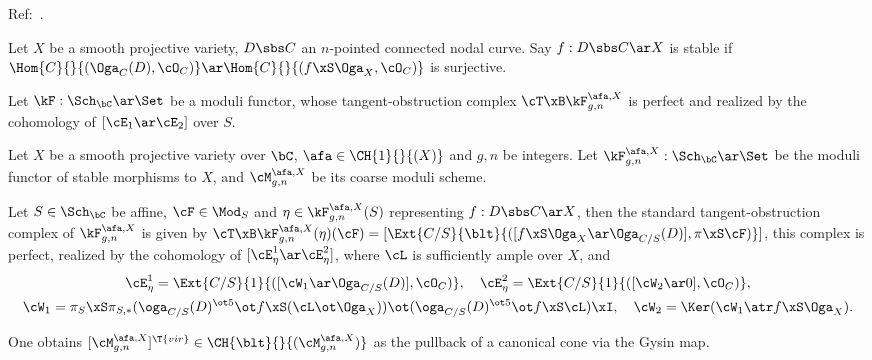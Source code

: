 \documentclass[a4paper, twoside]{article}
\begin{document}
\confighead{}{}{}


Ref:~\cite{LT1998}.

\begin{cmt}[0]
    \begin{dfn}
        Let $X$ be a smooth projective variety, $D\sbs C$ an $n$-pointed connected nodal curve. Say $f:D\sbs C\ar X$ is stable if $\Hom{C}{}{(\Oga_{C}(D),\cO_{C})}\ar\Hom{C}{}{(f\xS\Oga_{X},\cO_{C})}$ is surjective.
    \end{dfn}
\end{cmt}

\begin{cmt}[0]
    Let $\kF:\Sch_{\bC}\ar\Set$ be a moduli functor, whose tangent-obstruction complex $\cT\xB\kF_{g,n}^{\afa,X}$ is perfect and realized by the cohomology of $[\cE_{1}\ar\cE_{2}]$ over $S$.

\end{cmt}

\begin{stp}
    Let $X$ be a smooth projective variety over $\bC$, $\afa\in\CH{1}{}{(X)}$ and $g,n$ be integers. Let $\kF_{g,n}^{\afa,X}:\Sch_{\bC}\ar\Set$ be the moduli functor of stable morphisms to $X$, and $\cM_{g,n}^{\afa,X}$ be its coarse moduli scheme.

    Let $S\in\Sch_{\bC}$ be affine, $\cF\in\Mod_{S}$ and $\eta\in\kF_{g,n}^{\afa,X}(S)$ representing $f:D\sbs C\ar X$, then the standard tangent-obstruction complex of $\kF_{g,n}^{\afa,X}$ is given by $\cT\xB\kF_{g,n}^{\afa,X}(\eta)(\cF)=[\Ext{C/S}{\blt}{([f\xS\Oga_{X}\ar\Oga_{C/S}(D)],\pi\xS\cF)}]$, this complex is perfect, realized by the cohomology of $[\cE_{\eta}^{1}\ar\cE_{\eta}^{2}]$, where $\cL$ is sufficiently ample over $X$, and
    \begin{gather*}
      \cE_{\eta}^{1}=\Ext{C/S}{1}{([\cW_{1}\ar\Oga_{C/S}(D)],\cO_{C})},\quad \cE_{\eta}^{2}=\Ext{C/S}{1}{([\cW_{2}\ar0],\cO_{C})}, \\
      \cW_{1}=\pi_{S}\xS\pi_{S,*}(\oga_{C/S}(D)^{\ot5}\ot f\xS(\cL\ot\Oga_{X}))\ot(\oga_{C/S}(D)^{\ot5}\ot f\xS\cL)\xI,\quad \cW_{2}=\Ker(\cW_{1}\atr f\xS\Oga_{X}).
    \end{gather*}

    One obtains $[\cM_{g,n}^{\afa,X}]^{\T{vir}}\in\CH{\blt}{}{(\cM_{g,n}^{\afa,X})}$ as the pullback of a canonical cone via the Gysin map.
\end{stp}
\end{document}
